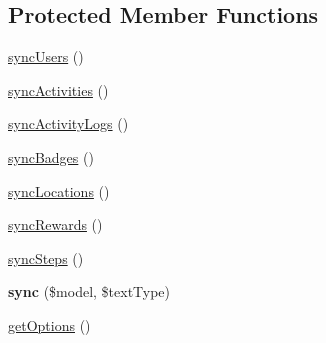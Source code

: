 \subsection*{Protected Member Functions}
\begin{DoxyCompactItemize}
\item 
\hyperlink{classDMA_1_1Friends_1_1Commands_1_1SyncFriendsDataCommand_aa1741c1d9185d3f4a0ec97cf9e48c203}{sync\+Users} ()
\item 
\hyperlink{classDMA_1_1Friends_1_1Commands_1_1SyncFriendsDataCommand_ab23b08985e311acb3500051cff40695c}{sync\+Activities} ()
\item 
\hyperlink{classDMA_1_1Friends_1_1Commands_1_1SyncFriendsDataCommand_a5254b5f02a6205032e5d3e4eff5014ff}{sync\+Activity\+Logs} ()
\item 
\hyperlink{classDMA_1_1Friends_1_1Commands_1_1SyncFriendsDataCommand_adb9ff20bd7896c45837a2bb3875b7341}{sync\+Badges} ()
\item 
\hyperlink{classDMA_1_1Friends_1_1Commands_1_1SyncFriendsDataCommand_a7d77ccaab1c7ef8e5aae89025406a2b3}{sync\+Locations} ()
\item 
\hyperlink{classDMA_1_1Friends_1_1Commands_1_1SyncFriendsDataCommand_a512183378589b9608c10601dd23e4579}{sync\+Rewards} ()
\item 
\hyperlink{classDMA_1_1Friends_1_1Commands_1_1SyncFriendsDataCommand_af58323945e0c8312d74aa70c8c40882a}{sync\+Steps} ()
\item 
\hypertarget{classDMA_1_1Friends_1_1Commands_1_1SyncFriendsDataCommand_abf9d939a6112bc5def1f83c237bdbd7e}{{\bfseries sync} (\$model, \$text\+Type)}\label{classDMA_1_1Friends_1_1Commands_1_1SyncFriendsDataCommand_abf9d939a6112bc5def1f83c237bdbd7e}

\item 
\hyperlink{classDMA_1_1Friends_1_1Commands_1_1SyncFriendsDataCommand_ab7474389993f9a38026170d5520194fa}{get\+Options} ()
\end{DoxyCompactItemize}
